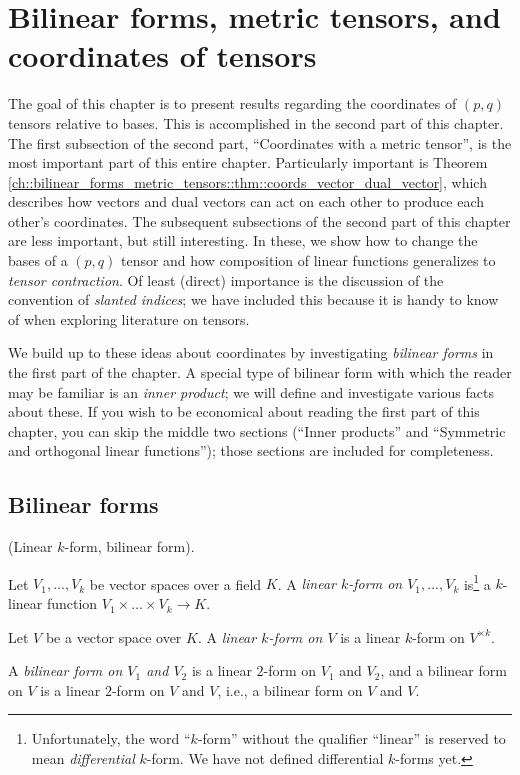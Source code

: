 \chapter{Bilinear forms, metric tensors, and coordinates of tensors}

\label{ch::bilinear_forms_metric_tensors}

The goal of this chapter is to present results regarding the coordinates of $(p, q)$ tensors relative to bases. This is accomplished in the second part of this chapter. The first subsection of the second part, ``Coordinates with a metric tensor'', is the most important part of this entire chapter. Particularly important is Theorem \ref{ch::bilinear_forms_metric_tensors::thm::coords_vector_dual_vector},
which describes how vectors and dual vectors can act on each other to produce each other's coordinates. The subsequent subsections of the second part of this chapter are less important, but still interesting. In these, we show how to change the bases of a $(p, q)$ tensor and how composition of linear functions generalizes to \textit{tensor contraction}. Of least (direct) importance is the discussion of the convention of \textit{slanted indices}; we have included this because it is handy to know of when exploring literature on tensors.

We build up to these ideas about coordinates by investigating \textit{bilinear forms} in the first part of the chapter. A special type of bilinear form with which the reader may be familiar is an \textit{inner product}; we will define and investigate various facts about these. If you wish to be economical about reading the first part of this chapter, you can skip the middle two sections (``Inner products'' and ``Symmetric and orthogonal linear functions''); those sections are included for completeness.

\section{Bilinear forms}

\begin{defn}
    (Linear $k$-form, bilinear form).
    
    Let $V_1, ..., V_k$ be vector spaces over a field $K$. A \textit{linear $k$-form on $V_1, ..., V_k$} is\footnote{Unfortunately, the word ``$k$-form'' without the qualifier ``linear'' is reserved to mean \textit{differential} $k$-form. We have not defined differential $k$-forms yet.} a $k$-linear function ${V_1 \times ... \times V_k \rightarrow K}$.
    
    Let $V$ be a vector space over $K$. A \textit{linear $k$-form on $V$} is a linear $k$-form on $V^{\times k}$.
    
    A \textit{bilinear form on $V_1$ and $V_2$} is a linear $2$-form on $V_1$ and $V_2$, and a bilinear form on $V$ is a linear $2$-form on $V$ and $V$, i.e., a bilinear form on $V$ and $V$.
\end{defn}

